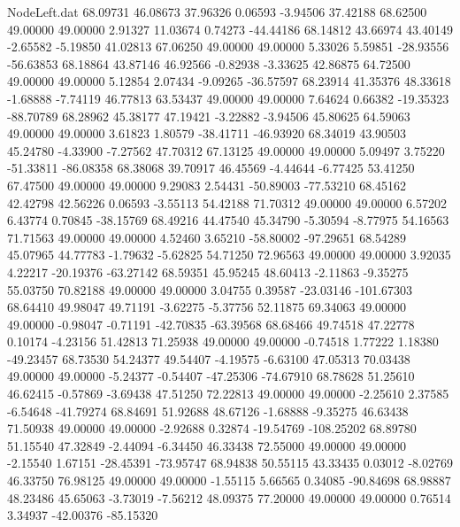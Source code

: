 \begin{filecontents}{NodeLeft.dat}
  68.09731   46.08673   37.96326     0.06593   -3.94506   37.42188   68.62500   49.00000   49.00000    2.91327   11.03674    0.74273  -44.44186
  68.14812   43.66974   43.40149    -2.65582   -5.19850   41.02813   67.06250   49.00000   49.00000    5.33026    5.59851  -28.93556  -56.63853
  68.18864   43.87146   46.92566    -0.82938   -3.33625   42.86875   64.72500   49.00000   49.00000    5.12854    2.07434   -9.09265  -36.57597
  68.23914   41.35376   48.33618    -1.68888   -7.74119   46.77813   63.53437   49.00000   49.00000    7.64624    0.66382  -19.35323  -88.70789
  68.28962   45.38177   47.19421    -3.22882   -3.94506   45.80625   64.59063   49.00000   49.00000    3.61823    1.80579  -38.41711  -46.93920
  68.34019   43.90503   45.24780    -4.33900   -7.27562   47.70312   67.13125   49.00000   49.00000    5.09497    3.75220  -51.33811  -86.08358
  68.38068   39.70917   46.45569    -4.44644   -6.77425   53.41250   67.47500   49.00000   49.00000    9.29083    2.54431  -50.89003  -77.53210
  68.45162   42.42798   42.56226     0.06593   -3.55113   54.42188   71.70312   49.00000   49.00000    6.57202    6.43774    0.70845  -38.15769
  68.49216   44.47540   45.34790    -5.30594   -8.77975   54.16563   71.71563   49.00000   49.00000    4.52460    3.65210  -58.80002  -97.29651
  68.54289   45.07965   44.77783    -1.79632   -5.62825   54.71250   72.96563   49.00000   49.00000    3.92035    4.22217  -20.19376  -63.27142
  68.59351   45.95245   48.60413    -2.11863   -9.35275   55.03750   70.82188   49.00000   49.00000    3.04755    0.39587  -23.03146 -101.67303
  68.64410   49.98047   49.71191    -3.62275   -5.37756   52.11875   69.34063   49.00000   49.00000   -0.98047   -0.71191  -42.70835  -63.39568
  68.68466   49.74518   47.22778     0.10174   -4.23156   51.42813   71.25938   49.00000   49.00000   -0.74518    1.77222    1.18380  -49.23457
  68.73530   54.24377   49.54407    -4.19575   -6.63100   47.05313   70.03438   49.00000   49.00000   -5.24377   -0.54407  -47.25306  -74.67910
  68.78628   51.25610   46.62415    -0.57869   -3.69438   47.51250   72.22813   49.00000   49.00000   -2.25610    2.37585   -6.54648  -41.79274
  68.84691   51.92688   48.67126    -1.68888   -9.35275   46.63438   71.50938   49.00000   49.00000   -2.92688    0.32874  -19.54769 -108.25202
  68.89780   51.15540   47.32849    -2.44094   -6.34450   46.33438   72.55000   49.00000   49.00000   -2.15540    1.67151  -28.45391  -73.95747
  68.94838   50.55115   43.33435     0.03012   -8.02769   46.33750   76.98125   49.00000   49.00000   -1.55115    5.66565    0.34085  -90.84698
  68.98887   48.23486   45.65063    -3.73019   -7.56212   48.09375   77.20000   49.00000   49.00000    0.76514    3.34937  -42.00376  -85.15320

\end{filecontents}
